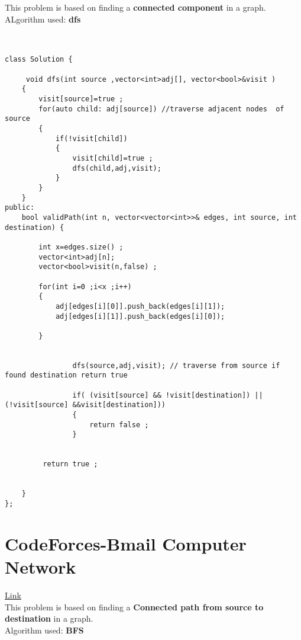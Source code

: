 \documentclass{article}
\begin{document}
This problem is based on finding a \textbf{connected component } in a graph.\\
ALgorithm used: \textbf{dfs }  \\ \\

{\small
\begin{lstlisting}[caption={},aboveskip=0pt, belowskip=0pt]

class Solution {

     void dfs(int source ,vector<int>adj[], vector<bool>&visit )
    {
        visit[source]=true ;
        for(auto child: adj[source]) //traverse adjacent nodes  of source 
        {
            if(!visit[child])
            {
                visit[child]=true ;
                dfs(child,adj,visit);
            }
        }
    }
public:
    bool validPath(int n, vector<vector<int>>& edges, int source, int destination) {
        
        int x=edges.size() ;
        vector<int>adj[n];
        vector<bool>visit(n,false) ;

        for(int i=0 ;i<x ;i++)
        {
            adj[edges[i][0]].push_back(edges[i][1]);
            adj[edges[i][1]].push_back(edges[i][0]);

        }

        
                dfs(source,adj,visit); // traverse from source if found destination return true 

                if( (visit[source] && !visit[destination]) ||  (!visit[source] &&visit[destination]))
                {
                    return false ;
                }
            
        
         return true ;


    }
};

\end{lstlisting}
}



\section{CodeForces-Bmail Computer Network} \href{https://codeforces.com/problemset/problem/1057/A}{Link} \\

This problem is based on finding a \textbf{Connected path from source to destination } in a graph.\\
Algorithm used: \textbf{BFS}\\
\\
\\
\\
\\
\\
\\
\end{document}
